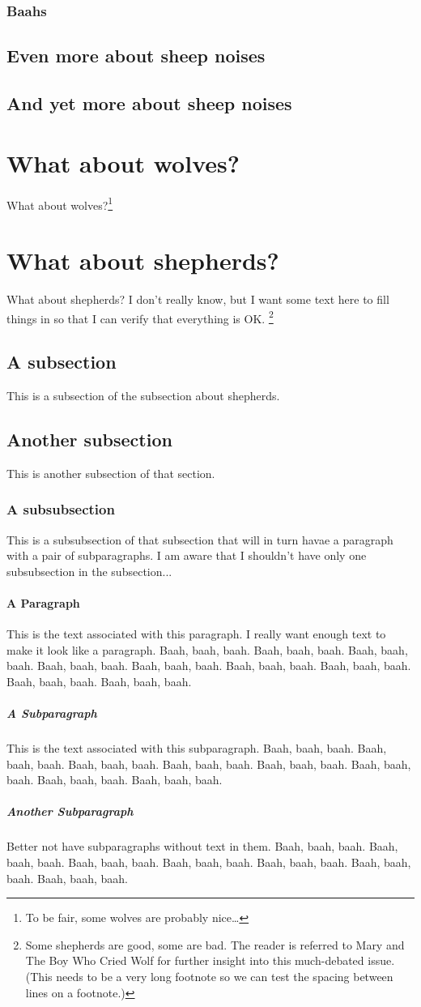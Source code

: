 \documentclass{umassthesis}          %
\begin{document}
\subsubsection{Baahs}
\subsection{Even more about sheep noises}
\subsection{And yet more about sheep noises}

\section{What about wolves?}
What about wolves?\footnote{To be fair, some wolves are probably nice\ldots}

\section{What about shepherds?}
What about shepherds?  I don't really know, but I want some text here
to fill things in so that I can verify that everything is OK.%
\footnote{Some shepherds are good, some are bad. The reader is referred
  to Mary and The Boy Who Cried Wolf for further insight into this
  much-debated issue. (This needs to be a very long footnote so we can
  test the spacing between lines on a footnote.)}
\subsection{A subsection}
This is a subsection of the subsection about shepherds.
\subsection{Another subsection}
This is another subsection of that section.
\subsubsection{A subsubsection}
This is a subsubsection of that subsection that will in turn havae a
paragraph with a pair of subparagraphs.  I am aware that I shouldn't
have only one subsubsection in the subsection...
\paragraph{A Paragraph} 
This is the text associated with this paragraph.  I really want enough
text to make it look like a paragraph.  Baah, baah, baah.  Baah, baah,
baah.  Baah, baah, baah.  Baah, baah, baah.  Baah, baah, baah.  Baah,
baah, baah.  Baah, baah, baah.  Baah, baah, baah.  Baah, baah, baah. 
\subparagraph{A Subparagraph} 
This is the text associated with this subparagraph.  Baah, baah, baah.
Baah, baah, baah.  Baah, baah, baah.  Baah, baah, baah.  Baah, baah,
baah.  Baah, baah, baah.  Baah, baah, baah.  Baah, baah, baah. 
\subparagraph{Another Subparagraph}
Better not have subparagraphs without text in them.  Baah, baah, baah.
Baah, baah, baah.  Baah, baah, baah.  Baah, baah, baah.  Baah, baah,
baah.  Baah, baah, baah.  Baah, baah, baah. 
\end{document}

